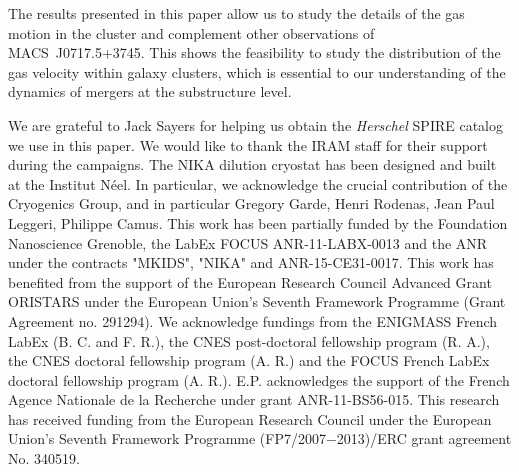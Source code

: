 \documentclass[twocolumn,traditabstract]{aa}
\begin{document}
The results presented in this paper allow us to study the details of the gas motion in the cluster and complement other observations of \mbox{MACS~J0717.5+3745}. This shows the feasibility to study the distribution of the gas velocity within galaxy clusters, which is essential to our understanding of the dynamics of mergers at the substructure level.

\begin{acknowledgements}
We are grateful to Jack Sayers for helping us obtain the \textit{Herschel} SPIRE catalog we use in this paper.
We would like to thank the IRAM staff for their support during the campaigns. 
The NIKA dilution cryostat has been designed and built at the Institut N\'eel. In particular, we acknowledge the crucial contribution of the Cryogenics Group, and  in particular Gregory Garde, Henri Rodenas, Jean Paul Leggeri, Philippe Camus. 
This work has been partially funded by the Foundation Nanoscience Grenoble, the LabEx FOCUS ANR-11-LABX-0013 and the ANR under the contracts "MKIDS", "NIKA" and ANR-15-CE31-0017. 
This work has benefited from the support of the European Research Council Advanced Grant ORISTARS under the European Union's Seventh Framework Programme (Grant Agreement no. 291294).
We acknowledge fundings from the ENIGMASS French LabEx (B. C. and F. R.), the CNES post-doctoral fellowship program (R. A.),  the CNES doctoral fellowship program (A. R.) and the FOCUS French LabEx doctoral fellowship program (A. R.).
E.P. acknowledges the support of the French Agence Nationale de la Recherche under grant ANR-11-BS56-015.
This research has received funding from the European Research Council under the European Union’s Seventh Framework Programme (FP7/2007−2013)/ERC grant agreement No. 340519.
\end{acknowledgements}


\end{document}
